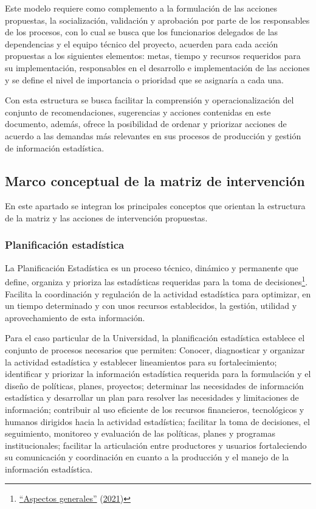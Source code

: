 \documentclass[
]{book}
\begin{document}
Este modelo requiere como complemento a la formulación de las acciones propuestas, la socialización, validación y aprobación por parte de los responsables de los procesos, con lo cual se busca que los funcionarios delegados de las dependencias y el equipo técnico del proyecto, acuerden para cada acción propuestas a los siguientes elementos: metas, tiempo y recursos requeridos para su implementación, responsables en el desarrollo e implementación de las acciones y se define el nivel de importancia o prioridad que se asignaría a cada una.

Con esta estructura se busca facilitar la comprensión y operacionalización del conjunto de recomendaciones, sugerencias y acciones contenidas en este documento, además, ofrece la posibilidad de ordenar y priorizar acciones de acuerdo a las demandas más relevantes en sus procesos de producción y gestión de información estadística.

\hypertarget{marco-conceptual-de-la-matriz-de-intervenciuxf3n}{%
\subsection{Marco conceptual de la matriz de intervención}\label{marco-conceptual-de-la-matriz-de-intervenciuxf3n}}

En este apartado se integran los principales conceptos que orientan la estructura de la matriz y las acciones de intervención propuestas.

\hypertarget{planificaciuxf3n-estaduxedstica}{%
\subsubsection{Planificación estadística}\label{planificaciuxf3n-estaduxedstica}}

La Planificación Estadística es un proceso técnico, dinámico y permanente que define, organiza y prioriza las estadísticas requeridas para la toma de decisiones\footnote{\protect\hyperlink{ref-BibEntry2021May}{{``{Aspectos generales}''}} (\protect\hyperlink{ref-BibEntry2021May}{2021})}. Facilita la coordinación y regulación de la actividad estadística para optimizar, en un tiempo determinado y con unos recursos establecidos, la gestión, utilidad y aprovechamiento de esta información.

Para el caso particular de la Universidad, la planificación estadística establece el conjunto de procesos necesarios que permiten: Conocer, diagnosticar y organizar la actividad estadística y establecer lineamientos para su fortalecimiento; identificar y priorizar la información estadística requerida para la formulación y el diseño de políticas, planes, proyectos; determinar las necesidades de información estadística y desarrollar un plan para resolver las necesidades y limitaciones de información; contribuir al uso eficiente de los recursos financieros, tecnológicos y humanos dirigidos hacia la actividad estadística; facilitar la toma de decisiones, el seguimiento, monitoreo y evaluación de las políticas, planes y programas institucionales; facilitar la articulación entre productores y usuarios fortaleciendo su comunicación y coordinación en cuanto a la producción y el manejo de la información estadística.
\end{document}

